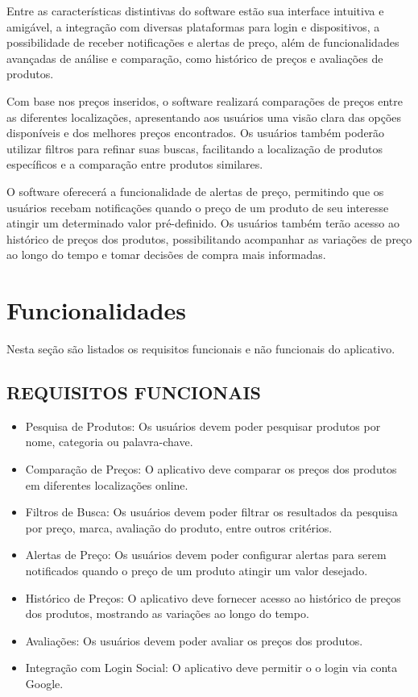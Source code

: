 Entre as características distintivas do software estão sua interface intuitiva e amigável, a integração com diversas plataformas para login e dispositivos, a possibilidade de receber notificações e alertas de preço, além de funcionalidades avançadas de análise e comparação, como histórico de preços e avaliações de produtos.

Com base nos preços inseridos, o software realizará comparações de preços entre as diferentes localizações, apresentando aos usuários uma visão clara das opções disponíveis e dos melhores preços encontrados. Os usuários também poderão utilizar filtros para refinar suas buscas, facilitando a localização de produtos específicos e a comparação entre produtos similares.

O software oferecerá a funcionalidade de alertas de preço, permitindo que os usuários recebam notificações quando o preço de um produto de seu interesse atingir um determinado valor pré-definido. Os usuários também terão acesso ao histórico de preços dos produtos, possibilitando acompanhar as variações de preço ao longo do tempo e tomar decisões de compra mais informadas.


\section{Funcionalidades} \label{sec:funcionalidades}

Nesta seção são listados os requisitos funcionais e não funcionais do aplicativo.

\subsection{REQUISITOS FUNCIONAIS}
\begin{itemize}
  \item Pesquisa de Produtos: Os usuários devem poder pesquisar produtos por nome, categoria ou palavra-chave.
  \item Comparação de Preços: O aplicativo deve comparar os preços dos produtos em diferentes localizações online.
  \item Filtros de Busca: Os usuários devem poder filtrar os resultados da pesquisa por preço, marca, avaliação do produto, entre outros critérios.
  \item Alertas de Preço: Os usuários devem poder configurar alertas para serem notificados quando o preço de um produto atingir um valor desejado.
  \item Histórico de Preços: O aplicativo deve fornecer acesso ao histórico de preços dos produtos, mostrando as variações ao longo do tempo.
  \item Avaliações: Os usuários devem poder avaliar os preços dos produtos.
  \item Integração com Login Social: O aplicativo deve permitir o o login via conta Google.
\end{itemize}


